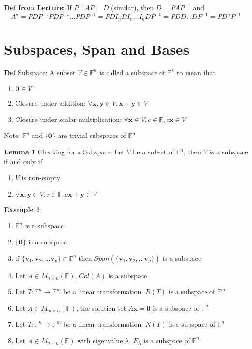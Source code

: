 \documentclass[11pt,notitlepage]{report}
\newcommand{\bb}[1]{\ensuremath{\mathbb{#1}}}
\newcommand{\tbf}[1]{\textbf{#1}}
\begin{document}
\textbf{Def from Lecture}: If $P^{-1}AP = D$ (similar), then $D = PAP^{-1}$ and
$$A^n = PDP^{-1}PDP^{-1}\dots PDP^{-1} = PDI_nDI_n\dots I_nDP^{-1} = PDD\dots DP^{-1} = PD^nP^{-1}$$

\newpage
\section{Subspaces, Span and Bases}

\textbf{Def} Subspace: A subset $V \in \bb F^n$ is called a subspace of $\bb F^n$ to mean that
\begin{enumerate}[label=(\roman*)]
    \item $\tbf 0 \in V$
    \item Closure under addition: $\forall\tbf x, \tbf y \in V, \tbf x + \tbf y \in V$
    \item Closure under scalar multiplication: $\forall\tbf x\in V, c \in \bb F, c\tbf x \in V$
\end{enumerate}
\hspace*{5mm} Note: $\bb F^n$ and $\{\tbf 0\}$ are trivial subspaces of $\bb F^n$

\textbf{Lemma 1} Checking for a Subspace: Let $V$ be a subset of $\bb F^n$, then $V$ is a subspace if and only if
\begin{enumerate}[label=(\roman*)]
    \item $V$ is non-empty
    \item $\forall\tbf x, \tbf y \in V, c \in \bb F, c\tbf x + \tbf y \in V$
\end{enumerate}

\textbf{Example 1}:
\begin{enumerate}[label=(\alph*)]
    \item $\bb F^n$ is a subspace
    \item $\{\tbf 0\}$ is a subspace
    \item if $\{\tbf v_1, \tbf v_2, \dots \tbf v_p\} \in \bb F^n$ then $Span(\{\tbf v_1, \tbf v_2, \dots \tbf v_p\})$ is a subspace
    \item Let $A \in M_{n \times n}(\bb F)$, $Col(A)$ is a subspace
    \item Let $T: \bb F^n \to \bb F^m$ be a linear transformation, $R(T)$ is a subspace of $\bb F^m$
    \item Let $A \in M_{m \times n}(\bb F)$, the solution set $A\tbf x = \tbf 0$ is a subspace of $\bb F^n$
    \item Let $T: \bb F^n \to \bb F^m$ be a linear transformation, $N(T)$ is a subspace of $\bb F^n$
    \item Let $A \in M_{n \times n}(\bb F)$ with eigenvalue $\lambda$, $E_\lambda$ is a subspace of $\bb F^n$
\end{enumerate}
\end{document}
